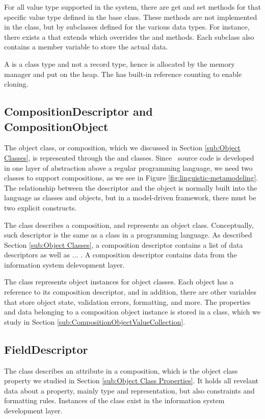 For all value type supported in the system, there are get and set methods for that specific value type defined in the base class. These methods are not implemented in the  class, but by subclasses defined for the various data types. For instance, there exists a  that extends  which overrides the  and  methods. Each subclass also contains a member variable to store the actual data.

A  is a class type and not a record type, hence is allocated by the memory manager and put on the heap. The  has built-in reference counting to enable cloning.

\subsection{CompositionDescriptor and CompositionObject}
\label{sub:CompositionDescriptor}
The object class, or composition, which we discussed in Section \ref{sub:Object Classes}, is represented through the  and  classes. Since \gap~source code is developed in one layer of abstraction above a regular programming language, we need two classes to support compositions, as we see in Figure \ref{fig:linguistic-metamodeling}. The relationship between the descriptor and the object is normally built into the language as classes and objects, but in a model-driven framework, there must be two explicit constructs.

The  class describes a composition, and represents an object class. Conceptually, such descriptor is the same as a class in a programming language. As described Section \ref{sub:Object Classes}, a composition descriptor contains a list of data descriptors as well as ... . A composition descriptor contains data from the information system delevopment layer.

The  class represents object instances for object classes. Each object has a reference to its composition descriptor, and in addition, there are other variables that store object state, validation errors, formatting, and more. The properties and data belonging to a composition object instance is stored in a  class, which we study in Section \ref{sub:CompositionObjectValueCollection}.


\subsection{FieldDescriptor}
\label{sub:DataDescriptor}
The  class describes an attribute in a composition, which is the object class property we studied in Section \ref{sub:Object Class Properties}. It holds all revelant data about a property, mainly type and representation, but also constraints and formatting rules. Instances of the  class exist in the information system development layer.

